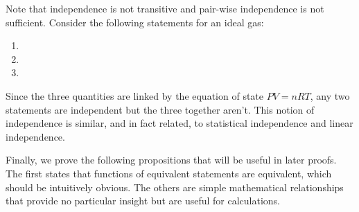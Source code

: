 \documentclass[11pt,letterpaper,fleqn]{memoir} %
\begin{document}
Note that independence is not transitive and pair-wise independence is not sufficient. Consider the following statements for an ideal gas:
\begin{enumerate}
	\item {}
	\item {}
	\item {}
\end{enumerate}
Since the three quantities are linked by the equation of state $PV=nRT$, any two statements are independent but the three together aren't. This notion of independence is similar, and in fact related, to statistical independence and linear independence.

Finally, we prove the following propositions that will be useful in later proofs. The first states that functions of equivalent statements are equivalent, which should be intuitively obvious. The others are simple mathematical relationships that provide no particular insight but are useful for calculations.
\end{document}
